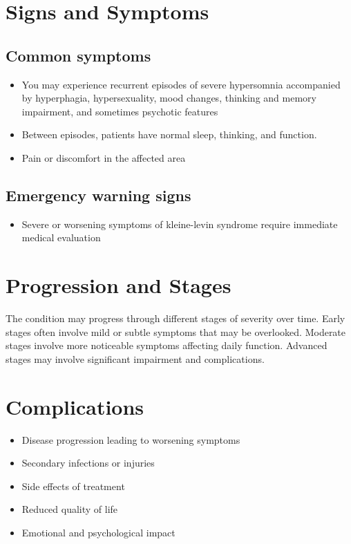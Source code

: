 \section{Signs and Symptoms}

\subsection{Common symptoms}
\begin{itemize}[noitemsep]
  \item You may experience recurrent episodes of severe hypersomnia accompanied by hyperphagia, hypersexuality, mood changes, thinking and memory impairment, and sometimes psychotic features
  \item Between episodes, patients have normal sleep, thinking, and function.
  \item Pain or discomfort in the affected area
  \end{itemize}

\subsection{Emergency warning signs}
\begin{itemize}[noitemsep]
  \item Severe or worsening symptoms of kleine-levin syndrome require immediate medical evaluation
\end{itemize}
\section{Progression and Stages}
The condition may progress through different stages of severity over time. Early stages often involve mild or subtle symptoms that may be overlooked. Moderate stages involve more noticeable symptoms affecting daily function. Advanced stages may involve significant impairment and complications.
\section{Complications}
\begin{itemize}[noitemsep]
  \item Disease progression leading to worsening symptoms
  \item Secondary infections or injuries
  \item Side effects of treatment
  \item Reduced quality of life
  \item Emotional and psychological impact
\end{itemize}
